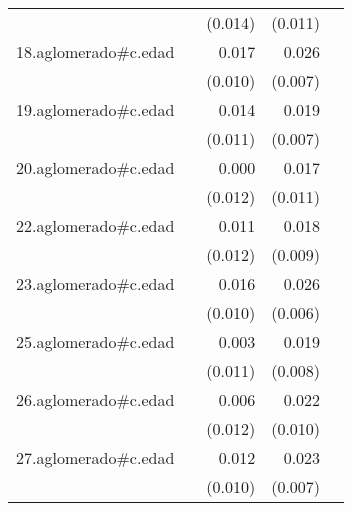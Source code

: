 {\begin{longtable}{l*{4}{D{.}{.}{-1}}}
            &                     &     (0.014)         &     (0.011)         &                     \\
\addlinespace
18.aglomerado#c.edad&                     &       0.017         &       0.026\sym{***}&                     \\
            &                     &     (0.010)         &     (0.007)         &                     \\
\addlinespace
19.aglomerado#c.edad&                     &       0.014         &       0.019\sym{**} &                     \\
            &                     &     (0.011)         &     (0.007)         &                     \\
\addlinespace
20.aglomerado#c.edad&                     &       0.000         &       0.017         &                     \\
            &                     &     (0.012)         &     (0.011)         &                     \\
\addlinespace
22.aglomerado#c.edad&                     &       0.011         &       0.018\sym{*}  &                     \\
            &                     &     (0.012)         &     (0.009)         &                     \\
\addlinespace
23.aglomerado#c.edad&                     &       0.016         &       0.026\sym{***}&                     \\
            &                     &     (0.010)         &     (0.006)         &                     \\
\addlinespace
25.aglomerado#c.edad&                     &       0.003         &       0.019\sym{*}  &                     \\
            &                     &     (0.011)         &     (0.008)         &                     \\
\addlinespace
26.aglomerado#c.edad&                     &       0.006         &       0.022\sym{*}  &                     \\
            &                     &     (0.012)         &     (0.010)         &                     \\
\addlinespace
27.aglomerado#c.edad&                     &       0.012         &       0.023\sym{***}&                     \\
            &                     &     (0.010)         &     (0.007)         &                     \\

\end{longtable}}
